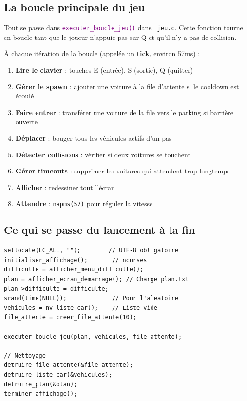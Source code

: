 \documentclass[11pt,a4paper]{article}
\newcommand{\code}[1]{\texttt{\textcolor{accent}{#1}}}
\newcommand{\fichier}[1]{\texttt{\textcolor{primary}{\faIcon{file-code} #1}}}
\newcommand{\fonction}[1]{\texttt{\textcolor{purple}{#1()}}}
\newcommand{\concept}[1]{\textcolor{primary}{\textbf{#1}}}
\begin{document}
\subsection{La boucle principale du jeu}

\begin{dangerbox}
Tout se passe dans \fonction{executer\_boucle\_jeu} dans \fichier{jeu.c}. Cette fonction tourne en boucle tant que le joueur n'appuie pas sur Q et qu'il n'y a pas de collision.
\end{dangerbox}

À chaque itération de la boucle (appelée un \concept{tick}, environ 57ms) :

\begin{enumerate}[noitemsep]
    \item \textbf{Lire le clavier} : touches E (entrée), S (sortie), Q (quitter)
    \item \textbf{Gérer le spawn} : ajouter une voiture à la file d'attente si le cooldown est écoulé
    \item \textbf{Faire entrer} : transférer une voiture de la file vers le parking si barrière ouverte
    \item \textbf{Déplacer} : bouger tous les véhicules actifs d'un pas
    \item \textbf{Détecter collisions} : vérifier si deux voitures se touchent
    \item \textbf{Gérer timeouts} : supprimer les voitures qui attendent trop longtemps
    \item \textbf{Afficher} : redessiner tout l'écran
    \item \textbf{Attendre} : \code{napms(57)} pour réguler la vitesse
\end{enumerate}

\subsection{Ce qui se passe du lancement à la fin}

\begin{codebox}
\begin{lstlisting}
setlocale(LC_ALL, "");        // UTF-8 obligatoire
initialiser_affichage();       // ncurses
difficulte = afficher_menu_difficulte();
plan = afficher_ecran_demarrage(); // Charge plan.txt
plan->difficulte = difficulte;
srand(time(NULL));             // Pour l'aleatoire
vehicules = nv_liste_car();    // Liste vide
file_attente = creer_file_attente(10);

executer_boucle_jeu(plan, vehicules, file_attente);

// Nettoyage
detruire_file_attente(&file_attente);
detruire_liste_car(&vehicules);
detruire_plan(&plan);
terminer_affichage();
\end{lstlisting}
\end{codebox}
\end{document}
